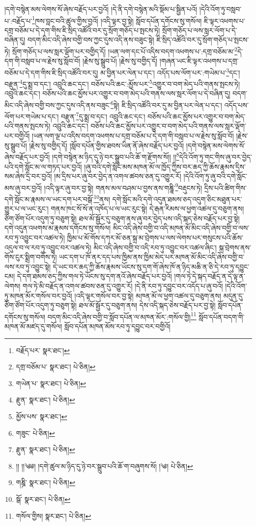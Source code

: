 །དགེ་བསྙེན་མས་ལེགས་སོ་ཞེས་བརྗོད་པར་བྱའོ། །དེ་ནི་དགེ་བསྙེན་མའི་སྡོམ་པ་སྦྱིན་པའོ། །དེའི་འོག་ཏུ་བསླབ་པ་:བརྗོད་པ་\footnote{བརྗོད་པར་  སྣར་ཐང་། }ཁས་བླང་བའི་ཚུལ་གྱིས་བྱའོ། །འདི་ལྟར་བྱ་སྟེ། སློབ་དཔོན་དགོངས་སུ་གསོལ། ཇི་ལྟར་འཕགས་པ་དགྲ་བཅོམ་པ་དེ་དག་གིས་ཇི་སྲིད་འཚོའི་བར་དུ་སྲོག་གཅོད་པ་སྤངས་ཏེ། སྲོག་གཅོད་པ་ལས་སླར་ལོག་པ་དེ་བཞིན་དུ། བདག་མིང་འདི་ཞེས་བགྱི་བས་ཀྱང་དུས་འདི་ནས་བཟུང་སྟེ། ཇི་སྲིད་འཚོའི་བར་དུ་སྲོག་གཅོད་པ་སྤངས་ཏེ། སྲོག་གཅོད་པ་ལས་སླར་ལྡོག་པར་བགྱིད་དོ། །ཡན་ལག་དང་པོ་འདིས་བདག་འཕགས་པ་:དགྲ་བཅོམ་མ་\footnote{དགྲ་བཅོམ་པ་  སྣར་ཐང་།  པེ་ཅིན། }དེ་དག་གི་བསླབ་པ་ལ་རྗེས་སུ་སློབ་བོ། །རྗེས་སུ་སྒྲུབ་པོ། །རྗེས་སུ་བགྱིད་དོ། །གཞན་ཡང་ཇི་ལྟར་འཕགས་པ་དགྲ་བཅོམ་པ་དེ་དག་གིས་ཇི་སྲིད་འཚོའི་བར་དུ། མ་བྱིན་པར་ལེན་པ་དང་། འདོད་པས་ལོག་པར་:གཡེམ་པ་\footnote{གཡེན་པ་  སྣར་ཐང་།  པེ་ཅིན། }དང་། བརྫུན་\footnote{རྫུན་  སྣར་ཐང་།  པེ་ཅིན། }དུ་སྨྲ་བ་དང་། འབྲུའི་ཆང་དང་། བཅོས་པའི་ཆང་:མྱོས་པར་\footnote{མྱོས་པས་  སྣར་ཐང་། }འགྱུར་བ་བག་མེད་པའི་གནས་སྤངས་ཏེ། འབྲུའི་ཆང་དང་། བཅོས་པའི་ཆང་མྱོས་པར་འགྱུར་བ་བག་མེད་པའི་གནས་ལས་སླར་ལོག་པ་དེ་བཞིན་དུ། བདག་མིང་འདི་ཞེས་བགྱི་བས་ཀྱང་དུས་འདི་ནས་བཟུང་\footnote{གཟུང་  པེ་ཅིན། }སྟེ། ཇི་སྲིད་འཚོའི་བར་དུ་མ་བྱིན་པར་ལེན་པ་དང་། འདོད་པས་ལོག་པར་གཡེམ་པ་དང་། བརྫུན་\footnote{རྫུན་  སྣར་ཐང་།  པེ་ཅིན། }དུ་སྨྲ་བ་དང་། འབྲུའི་ཆང་དང་། བཅོས་པའི་ཆང་མྱོས་པར་འགྱུར་བ་བག་མེད་པའི་གནས་སྤངས་ཏེ། འབྲུའི་ཆང་དང་། བཅོས་པའི་ཆང་མྱོས་པར་འགྱུར་བ་བག་མེད་པའི་གནས་ལས་སླར་ལྡོག་པར་བགྱིའོ། །ཡན་ལག་ལྔ་པ་འདིས་བདག་འཕགས་པ་དགྲ་བཅོམ་པ་དེ་དག་གི་བསླབ་པ་ལ་རྗེས་སུ་སློབ་བོ། །རྗེས་སུ་སྒྲུབ་པོ། །རྗེས་སུ་བགྱིད་དོ། །སློབ་དཔོན་གྱིས་ཐབས་ཡིན་ནོ་ཞེས་བརྗོད་པར་བྱའོ། །དགེ་བསྙེན་མས་ལེགས་སོ་ཞེས་བརྗོད་པར་བྱའོ། །དགེ་བསྙེན་མ་ཉིད་དུ་ཉེ་བར་སྒྲུབ་པའི་ཆོ་ག་རྫོགས་སོ།། །།\footnote{།། །།༄༅། །དགེ་ཚུལ་མ་ཉིད་དུ་ཉེ་བར་སྒྲུབ་པའི་ཆོ་ག་བཞུགས་སོ། །༄།   པེ་ཅིན། }དེའི་འོག་ཏུ་གང་གིས་ཞུ་བར་བྱེད་པའི་དགེ་སློང་མ་ལ་གཏད་པར་བྱའོ། །ཞུ་བའི་དགེ་སློང་མས་མཁན་མོ་ལ་ཁྱོད་ཀྱིས་བར་ཆད་ཀྱི་ཆོས་རྣམས་དྲིས་སམ་ཞེས་དྲི་བར་བྱའོ། །མ་དྲིས་པར་ཞུ་བར་བྱེད་ན་འགལ་ཚབས་ཅན་དུ་འགྱུར་རོ། །དེའི་འོག་ཏུ་ཞུ་བའི་དགེ་སློང་མས་ཞུ་བར་བྱའོ། །འདི་ལྟར་ཞུ་བར་བྱ་སྟེ། གནས་མལ་བཤམ་པ་བྱས་ནས་གཎྜཱི་\footnote{གཎྜི་  སྣར་ཐང་།  པེ་ཅིན། }བརྡུངས་ཏེ། དྲིས་པའི་ཚིག་གིས་དགེ་སློང་མ་རྣམས་ལ་ཡང་དག་པར་བསྒོ་\footnote{སྒོ་  སྣར་ཐང་།  པེ་ཅིན། }ནས། དགེ་སློང་མའི་དགེ་འདུན་ཐམས་ཅད་འདུག་ཅིང་མཐུན་པར་གྱུར་པ་ལ་ཡང་རུང་། གནས་ཁང་སོ་སོ་ན་འཁོད་པ་ལ་ཡང་རུང་སྟེ། དེ་རྒན་རིམས་ལ་ཕྱག་འཚལ་དུ་བཅུག་ནས། ཙོག་ཙོག་པོར་འདུག་ཏུ་བཅུག་སྟེ། ཐལ་མོ་སྦྱོར་དུ་བཅུག་ནས་ཞུ་བར་བྱེད་པས་འདི་སྐད་ཅེས་བརྗོད་པར་བྱ་སྟེ། དགེ་འདུན་འཕགས་མ་རྣམས་དགོངས་སུ་གསོལ། མིང་འདི་ཞེས་བགྱི་བ་འདི་མཁན་མོ་མིང་འདི་ཞེས་བགྱི་བ་ལས་རབ་ཏུ་འབྱུང་བར་འཚལ་ཏེ། ཁྱིམ་པ་མོ་གོས་དཀར་མོ་ཅན་སྐྲ་མ་བྲེགས་པ་ལས་ལེགས་པར་གསུངས་པའི་ཆོས་འདུལ་བ་ལ་རབ་ཏུ་འབྱུང་བར་འཚལ་ཏེ། མིང་འདི་ཞེས་བགྱི་བ་འདི་རབ་ཏུ་འབྱུང་བར་འཚལ་ཞིང་། སྐྲ་བྲེགས་ནས་གོས་ངུར་སྨྲིག་བགོས་ཏེ། ཡང་དག་པ་ཁོ་ནར་དད་པས་ཁྱིམ་ནས་ཁྱིམ་མེད་པར་མཁན་མོ་མིང་འདི་ཞེས་བགྱི་བ་ལས་རབ་ཏུ་འབྱུང་སྟེ། དེ་ཡང་བར་ཆད་ཀྱི་ཆོས་རྣམས་ཡོངས་སུ་དག་གོ་ཞེས་ཁོ་ན་ཉིད་མཆི་ན་ཅི་དེ་རབ་ཏུ་དབྱུང་ངམ། དེ་དག་ཐམས་ཅད་ཀྱིས་གལ་ཏེ་ཡོངས་སུ་དག་ནའོ་ཞེས་བརྗོད་པར་བྱའོ། །གལ་ཏེ་དེ་སྐད་བརྗོད་ན་དེ་ལྟ་ན་ལེགས། གལ་ཏེ་མི་བརྗོད་ན་འགལ་ཚབས་ཅན་དུ་འགྱུར་རོ། །དེ་ནི་རབ་ཏུ་དབྱུང་བར་འདོད་པ་ཞུ་བའོ། །དེའི་འོག་ཏུ་མཁན་མོར་གསོལ་བར་བྱའོ། །འདི་ལྟར་གསོལ་བར་བྱ་སྟེ། མཁན་མོ་ལ་ཕྱག་འཚལ་དུ་བཅུག་ནས། མདུན་དུ་ཙོག་ཙོག་པོར་འདུག་ཏུ་བཅུག་སྟེ། ཐལ་མོ་སྦྱོར་དུ་བཅུག་ནས། དེས་འདི་སྐད་ཅེས་བརྗོད་པར་བྱ་སྟེ། སློབ་དཔོན་དགོངས་སུ་གསོལ། བདག་མིང་འདི་ཞེས་བགྱི་བ་སློབ་དཔོན་ལ་མཁན་མོར་:གསོལ་གྱི།\footnote{གསོལ་གྱིས།  སྣར་ཐང་།  པེ་ཅིན། } སློབ་དཔོན་བདག་གི་མཁན་མོ་མཛད་དུ་གསོལ། སློབ་དཔོན་མཁན་མོས་རབ་ཏུ་དབྱུང་བར་བགྱིའོ། 